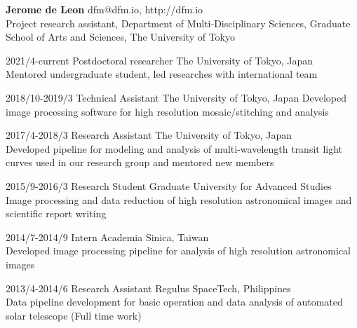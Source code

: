 \documentclass[12pt,letterpaper]{article}
\begin{document}
\thispagestyle{empty}\sloppy\sloppypar\raggedbottom

\textbf{\Large Jerome de Leon} \hfill
\textsf{\small dfm@dfm.io, http://dfm.io} \\[0.5ex]
Project research assistant, Department of Multi-Disciplinary Sciences, Graduate School of Arts and Sciences, The University of Tokyo\\[0.5ex]

\begin{list}{}{\cvlist}
\item 2021/4-current	Postdoctoral researcher	The University of Tokyo, Japan\\
Mentored undergraduate student, led researches with international team\\
\item 2018/10-2019/3	Technical Assistant		The University of Tokyo, Japan
Developed image processing software for high resolution mosaic/stitching and analysis\\
\item 2017/4-2018/3 	Research Assistant		The University of Tokyo, Japan\\
Developed pipeline for modeling and analysis of multi-wavelength transit light curves used in our research group and mentored new members\\ 
\item 2015/9-2016/3 	Research Student		Graduate University for Advanced Studies\\
Image processing and data reduction of high resolution astronomical images and scientific report writing\\
\item 2014/7-2014/9		Intern				Academia Sinica, Taiwan\\
Developed image processing pipeline for analysis of high resolution astronomical images\\
\item 2013/4-2014/6  	Research Assistant 	Regulus SpaceTech, Philippines\\
Data pipeline development for basic operation and data analysis of automated solar telescope (Full time work)\\

\end{list}

\begin{list}{}{\cvlist}

\end{list}
\end{document}
